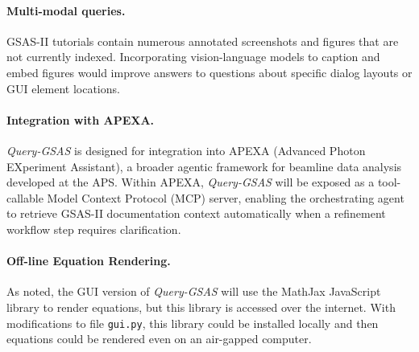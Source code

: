 \paragraph{Multi-modal queries.}
GSAS-II tutorials contain numerous annotated screenshots and
figures that are not currently indexed.
Incorporating vision-language models to caption and embed figures
would improve answers to questions about specific dialog layouts
or GUI element locations.

\paragraph{Integration with APEXA.}
\textit{Query-GSAS} is designed for integration into APEXA
(Advanced Photon EXperiment Assistant), a broader agentic framework
for beamline data analysis developed at the APS.
Within APEXA, \textit{Query-GSAS} will be exposed as a tool-callable
Model Context Protocol (MCP) server, enabling the orchestrating
agent to retrieve GSAS-II documentation context automatically
when a refinement workflow step requires clarification.

\paragraph{Off-line Equation Rendering.}
As noted, the GUI version of \textit{Query-GSAS} will use the MathJax JavaScript library to render equations, but this library is accessed over the internet. With modifications to file \texttt{gui.py}, this library could be installed locally and then equations could be rendered even on an air-gapped computer. 